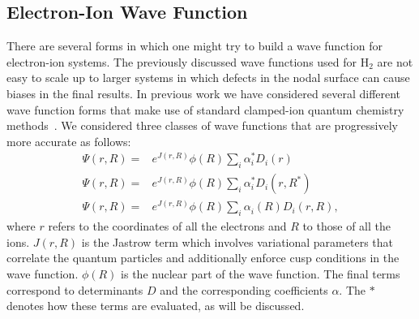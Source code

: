 \documentclass[aip,jcp,numerical,reprint]{revtex4-1}
\begin{document}
\subsection{Electron-Ion Wave Function}
 There are several forms in which one might try to build a wave function for electron-ion systems.  The previously discussed wave functions used for H$_{2}$ are not easy to scale up to larger systems in which defects in the nodal surface can cause biases in the final results.   %
In previous work we have considered several different wave function forms that make use of standard clamped-ion quantum chemistry methods~\cite{Tubman_ECG}. %
We considered three classes of wave functions that are progressively more accurate as follows:
\begin{align}
\Psi(r,R) =& e^{J(r,R)}\phi(R)\sum_{i}\alpha^{*}_{i} D_{i}(r) \label{eqn:wfs1}\\
\Psi(r,R) =&e^{J(r,R)}\phi(R)\sum_{i}\alpha^{*}_{i} D_{i}(r,R^{*}) \label{eqn:wfs2}\\
\Psi(r,R) =& e^{J(r,R)}\phi(R)\sum_{i}\alpha^{}_{i}(R) D_{i}(r,R), \label{eqn:wfs3}
\end{align}
where $r$ refers to the coordinates of all the electrons and $R$ to those of all the ions.  $J(r,R)$ is the Jastrow term which involves variational parameters that correlate the quantum particles and additionally  enforce cusp conditions in the wave function.  $\phi(R)$ is the nuclear part of the wave function. The final terms correspond to determinants $D$ and the corresponding coefficients $\alpha$.    The $*$ denotes how these terms are evaluated, as will be discussed. 
\end{document}
